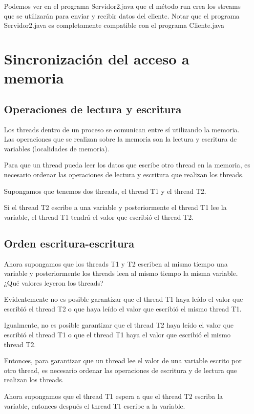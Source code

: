Podemos ver en el programa Servidor2.java que el método run crea los streams que se utilizarán para enviar y recibir datos del cliente. Notar que el programa Servidor2.java es completamente compatible con el programa Cliente.java

\chapter{Sincronización del acceso a memoria}

\section{Operaciones de lectura y escritura}

Los threads dentro de un proceso se comunican entre sí utilizando la memoria. Las operaciones que se realizan sobre la memoria son la lectura y escritura de variables (localidades de memoria).

Para que un thread pueda leer los datos que escribe otro thread en la memoria, es necesario ordenar las operaciones de lectura y escritura que realizan los threads.

Supongamos que tenemos dos threads, el thread T1 y el thread T2.

Si el thread T2 escribe a una variable y posteriormente el thread T1 lee la variable, el thread T1 tendrá el valor que escribió el thread T2.

\section{Orden escritura-escritura}

Ahora supongamos que los threads T1 y T2 escriben al mismo tiempo una variable y posteriormente los threads leen al mismo tiempo la misma variable. ¿Qué valores leyeron los threads?

Evidentemente no es posible garantizar que el thread T1 haya leído el valor que escribió el thread T2 o que haya leído el valor que escribió el mismo thread T1. 

Igualmente, no es posible garantizar que el thread T2 haya leído el valor que escribió el thread T1 o que el thread T1 haya el valor que escribió el mismo thread T2.

Entonces, para garantizar que un thread lee el valor de una variable escrito por otro thread, es necesario ordenar las operaciones de escritura y de lectura que realizan los threads.

Ahora supongamos que el thread T1 espera a que el thread T2 escriba la variable, entonces después el thread T1 escribe a la variable.

